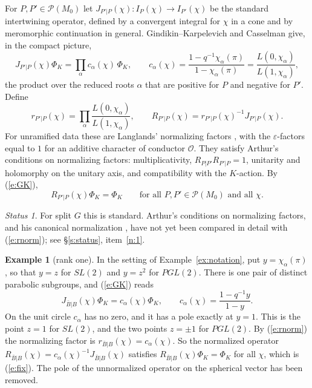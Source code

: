 \documentclass[12pt,letterpaper]{article}
\numberwithin{equation}{section}
\theoremstyle{plain}
\theoremstyle{definition}
\newtheorem{example}[theorem]{Example}
\theoremstyle{remark}
\newtheorem{status}[theorem]{Status}
\newcommand{\OO}{\mathcal{O}}
\newcommand{\cP}{\mathcal{P}}
\begin{document}
For $P,P'\in\cP(M_0)$ let $J_{P'|P}(\chi):I_P(\chi)\to I_{P'}(\chi)$ be the standard intertwining operator, defined by a convergent integral for $\chi$ in a cone and by meromorphic continuation in general. Gindikin--Karpelevich and Casselman \cite[Thm.~3.1]{Ca80} give, in the compact picture,
\begin{equation}\label{e:GK}
J_{P'|P}(\chi)\Phi_K=\prod_{\alpha}c_\alpha(\chi)\,\Phi_K,\qquad c_\alpha(\chi)=\frac{1-q^{-1}\chi_\alpha(\pi)}{1-\chi_\alpha(\pi)}=\frac{L(0,\chi_\alpha)}{L(1,\chi_\alpha)},
\end{equation}
the product over the reduced roots $\alpha$ that are positive for $P$ and negative for $P'$. Define
\begin{equation}\label{e:rnorm}
r_{P'|P}(\chi)=\prod_\alpha\frac{L(0,\chi_\alpha)}{L(1,\chi_\alpha)},\qquad R_{P'|P}(\chi)=r_{P'|P}(\chi)^{-1}J_{P'|P}(\chi).
\end{equation}
For unramified data these are Langlands' normalizing factors \cite{La76}, with the $\varepsilon$-factors equal to $1$ for an additive character of conductor $\OO$. They satisfy Arthur's conditions on normalizing factors: multiplicativity, $R_{P|P'}R_{P'|P}=1$, unitarity and holomorphy on the unitary axis, and compatibility with the $K$-action. By (\ref{e:GK}),
\begin{equation}\label{e:fix}
R_{P'|P}(\chi)\Phi_K=\Phi_K\qquad\text{for all }P,P'\in\cP(M_0)\text{ and all }\chi.
\end{equation}

\begin{status}
For split $G$ this is standard. Arthur's conditions on normalizing factors, and his canonical normalization \cite{Ar98}, have not yet been compared in detail with (\ref{e:rnorm}); see \S\ref{s:status}, item~\ref{n:1}.
\end{status}

\begin{example}[rank one]\label{ex:norm}
In the setting of Example~\ref{ex:notation}, put $y=\chi_\alpha(\pi)$, so that $y=z$ for $SL(2)$ and $y=z^2$ for $PGL(2)$. There is one pair of distinct parabolic subgroups, and (\ref{e:GK}) reads
\[
J_{\bar B|B}(\chi)\Phi_K=c_\alpha(\chi)\Phi_K,\qquad c_\alpha(\chi)=\frac{1-q^{-1}y}{1-y}.
\]
On the unit circle $c_\alpha$ has no zero, and it has a pole exactly at $y=1$. This is the point $z=1$ for $SL(2)$, and the two points $z=\pm1$ for $PGL(2)$. By (\ref{e:rnorm}) the normalizing factor is $r_{\bar B|B}(\chi)=c_\alpha(\chi)$. So the normalized operator $R_{\bar B|B}(\chi)=c_\alpha(\chi)^{-1}J_{\bar B|B}(\chi)$ satisfies $R_{\bar B|B}(\chi)\Phi_K=\Phi_K$ for all $\chi$, which is (\ref{e:fix}). The pole of the unnormalized operator on the spherical vector has been removed.
\end{example}
\end{document}
